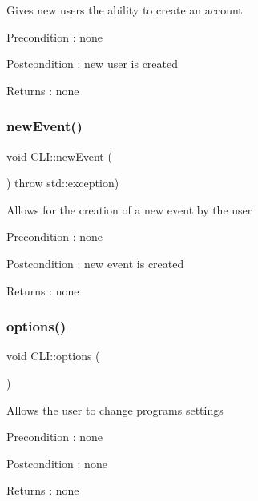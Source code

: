 Gives new users the ability to create an account \begin{DoxyPrecond}{Precondition}
\+: none 
\end{DoxyPrecond}
\begin{DoxyPostcond}{Postcondition}
\+: new user is created 
\end{DoxyPostcond}
\begin{DoxyReturn}{Returns}
\+: none 
\end{DoxyReturn}
\mbox{\label{class_c_l_i_a601b6eb021d5348a44450dc95c2fe4ac}} 
\subsubsection{\texorpdfstring{new\+Event()}{newEvent()}}
{\footnotesize\ttfamily void C\+L\+I\+::new\+Event (\begin{DoxyParamCaption}{ }\end{DoxyParamCaption}) throw  std\+::exception) }

Allows for the creation of a new event by the user \begin{DoxyPrecond}{Precondition}
\+: none 
\end{DoxyPrecond}
\begin{DoxyPostcond}{Postcondition}
\+: new event is created 
\end{DoxyPostcond}
\begin{DoxyReturn}{Returns}
\+: none 
\end{DoxyReturn}
\mbox{\label{class_c_l_i_ac887b1d04b359b0687c18b7fd3c9db55}} 
\subsubsection{\texorpdfstring{options()}{options()}}
{\footnotesize\ttfamily void C\+L\+I\+::options (\begin{DoxyParamCaption}{ }\end{DoxyParamCaption})}

Allows the user to change programs settings \begin{DoxyPrecond}{Precondition}
\+: none 
\end{DoxyPrecond}
\begin{DoxyPostcond}{Postcondition}
\+: none 
\end{DoxyPostcond}
\begin{DoxyReturn}{Returns}
\+: none 
\end{DoxyReturn}
\mbox{\label{class_c_l_i_a89320677b9fb2a4ab06a76834cbf3e33}} 
